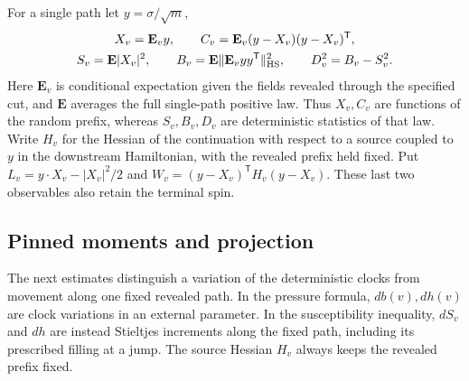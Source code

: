 For a single path let \(y=\sigma/\sqrt m\),
\[
\begin{gathered}
 X_v=\mathbf E_v y,\qquad C_v=\mathbf E_v(y-X_v)(y-X_v)^{\mathsf T},\\
 S_v=\mathbf E|X_v|^2,\qquad
 B_v=\mathbf E\|\mathbf E_v yy^{\mathsf T}\|_{\rm HS}^2,\qquad D_v^2=B_v-S_v^2.
\end{gathered}
\]
Here \(\mathbf E_v\) is conditional expectation given the fields revealed
through the specified cut, and \(\mathbf E\) averages the full single-path
positive law. Thus \(X_v,C_v\) are functions of the random prefix, whereas
\(S_v,B_v,D_v\) are deterministic statistics of that law. Write \(H_v\)
for the Hessian of the continuation with respect to a source coupled to
\(y\) in the downstream Hamiltonian, with the revealed prefix held fixed. Put
\(L_v=y\cdot X_v-|X_v|^2/2\) and
\(W_v=(y-X_v)^{\mathsf T}H_v(y-X_v)\). These last two observables also
retain the terminal spin.

\subsection{Pinned moments and projection}

The next estimates distinguish a variation of the deterministic clocks
from movement along one fixed revealed path. In the pressure formula,
\(db(v),dh(v)\) are clock variations in an external parameter. In
the susceptibility inequality, \(dS_v\) and \(dh\) are instead
Stieltjes increments along the fixed path, including its prescribed
filling at a jump. The source Hessian \(H_v\) always keeps the
revealed prefix fixed.

